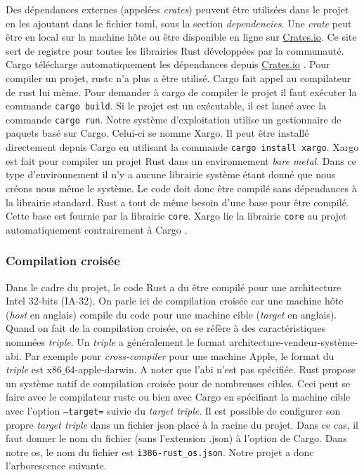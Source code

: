 Des dépendances externes (appelées \textit{crates}) peuvent être utilisées dans
le projet en les ajoutant dans le fichier \acrshort{toml}, sous la section \textit{dependencies}.
Une \textit{crate} peut être en local sur la machine hôte ou être disponible en ligne
sur \href{https://crates.io}{Crates.io}. Ce site sert de registre pour toutes les
librairies Rust développées par la communauté. Cargo télécharge automatiquement
les dépendances depuis \href{https://crates.io}{Crates.io} \cite{ref2}. Pour compiler un projet,
rustc n'a plus a être utilisé. Cargo fait appel au compilateur
de rust lui même. Pour demander à cargo de compiler le projet il faut exécuter
la commande \texttt{cargo build}. Si le projet est un exécutable,
il est lancé avec la commande \texttt{cargo run}. Notre système
d'exploitation utilise un gestionnaire de paquets basé sur Cargo. Celui-ci
se nomme Xargo. Il peut être installé directement depuis Cargo en utilisant
la commande \texttt{cargo install xargo}. Xargo est fait pour compiler
un projet Rust dans un environnement \textit{bare metal}. Dans ce type d'environnement
il n'y a aucune librairie système étant donné que nous créons nous même le système.
Le code doit donc être compilé sans dépendances à la librairie standard. Rust a tout
de même besoin d'une base pour être compilé. Cette base est fournie par la librairie
\texttt{core}. Xargo lie la librairie \texttt{core} au projet
automatiquement contrairement à Cargo \cite{ref8}.


\subsubsection{Compilation croisée}
Dans le cadre du projet, le code Rust a du être compilé pour une architecture
Intel 32-bits (\acrshort{IA-32}). On parle ici de compilation croisée
car une machine hôte (\textit{host} en anglais) compile du code pour une
machine cible (\textit{target} en anglais). Quand on fait de la compilation
croisée, on se réfère à des caractéristiques nommées \textit{triple}. Un \textit{triple}
a généralement le format architecture-vendeur-système-\acrshort{abi}. Par exemple
pour \textit{cross-compiler} pour une machine Apple, le format du \textit{triple}
est x86$\_$64-apple-darwin. A noter que l'\acrshort{abi} n'est pas spécifiée.
Rust propose un système natif de compilation croisée pour de nombreuses cibles.
Ceci peut se faire avec le compilateur rustc ou bien avec Cargo en spécifiant
la machine cible avec l'option \texttt{--target=} suivie du
\textit{target triple}. Il est possible de configurer son propre \textit{target triple}
dans un fichier \acrshort{json} placé à la racine du projet. Dans ce cas, il
faut donner le nom du fichier (sans l'extension .json) à l'option de Cargo.
Dans notre \acrshort{os}, le nom du fichier est \texttt{i386-rust_os.json}.
Notre projet a donc l'arborescence suivante. \\

